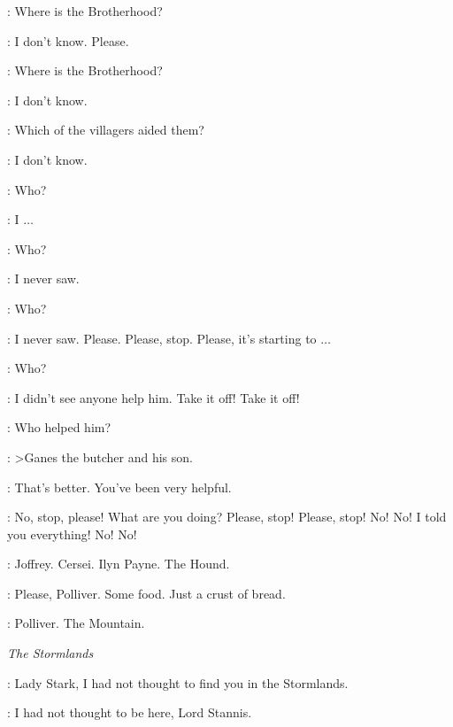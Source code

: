 \TICKLER: Where is the Brotherhood? 

\PRISONER: I don't know. Please. 

\TICKLER: Where is the Brotherhood? 

\PRISONER: I don't know. 

\TICKLER: Which of the villagers aided them? 

\PRISONER: I don't know. 

\TICKLER: Who? 


\PRISONER: I $\ldots$  

\TICKLER: Who? 

\PRISONER: I never saw. 

\TICKLER: Who? 

\PRISONER: I never saw. Please. Please, stop. Please, it's starting to $\ldots$  

\TICKLER: Who? 

\PRISONER: I didn't see anyone help him. Take it off! Take it off! 

\TICKLER: Who helped him? 

\PRISONER: >Ganes the butcher and his son.

\TICKLER: That's better. You've been very helpful. 


\PRISONER: No, stop, please! What are you doing? Please, stop! Please, stop! No! No! I told you everything! No! No! 


\ARYA: Joffrey. Cersei. Ilyn Payne. The Hound. 

\PEASANTWOMAN:  Please, Polliver. Some food. Just a crust of bread. 


\ARYA: Polliver. The Mountain. 



\scene

\textit{The Stormlands} 


\STANNIS: Lady Stark, I had not thought to find you in the Stormlands. 

\CATELYN: I had not thought to be here, Lord Stannis. 


